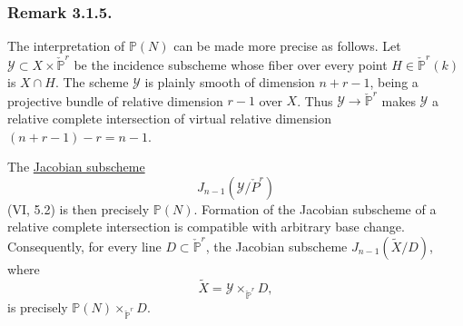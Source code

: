 \subsubsection*{Remark 3.1.5.}
The interpretation of $\mathbb P(N)$ can be made more precise as
follows.  Let
$\mathcal Y\subset X\times\check{\mathbb P}^{r}$ be the incidence
subscheme whose fiber over every point
$H\in\check{\mathbb P}^{r}(k)$ is $X\cap H$.  The scheme $\mathcal Y$
is plainly smooth of dimension $n+r-1$, being a projective bundle of
relative dimension $r-1$ over $X$.  Thus
$\mathcal Y\to\check{\mathbb P}^{r}$ makes $\mathcal Y$ a relative
complete intersection of virtual relative dimension
$(n+r-1)-r=n-1$.

The \underline{Jacobian subscheme}
\[
J_{n-1}(\mathcal Y/\check P^{r})
\]
(VI, 5.2) is then precisely $\mathbb P(N)$.  Formation of the
Jacobian subscheme of a relative complete intersection is compatible
with arbitrary base change.  Consequently, for every line
$D\subset\check{\mathbb P}^{r}$, the Jacobian subscheme
$J_{n-1}(\widetilde X/D)$, where
\[
\widetilde X=\mathcal Y\times_{\check{\mathbb P}^{r}}D,
\]
is precisely
$\mathbb P(N)\times_{\check{\mathbb P}^{r}}D$.
